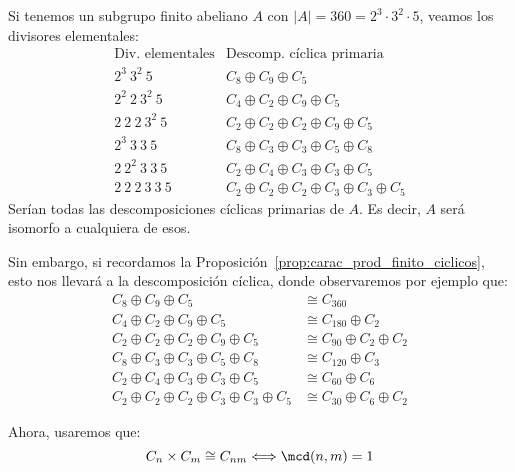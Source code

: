 \begin{ejemplo}
    Si tenemos un subgrupo finito abeliano $A$ con $|A| = 360 = 2^3\cdot 3^2\cdot 5$, veamos los divisores elementales:
    \begin{equation*}
        \begin{array}{r|l}
            \text{Div. elementales} & \text{Descomp. cíclica primaria} \\
            \hline
            2^3\ 3^2\ 5 & C_8\oplus C_9 \oplus C_5 \\
            2^2\ 2\ 3^2\ 5 & C_4\oplus C_2 \oplus C_9 \oplus C_5\\
            2\ 2\ 2\ 3^2\ 5 & C_2 \oplus C_2 \oplus C_2 \oplus C_9 \oplus C_5\\
            2^3\ 3\ 3\ 5 & C_8\oplus C_3 \oplus C_3 \oplus C_5 \oplus C_8\\
            2\ 2^2\ 3\ 3\ 5 & C_2 \oplus C_4 \oplus C_3 \oplus C_3 \oplus C_5\\
            2\ 2\ 2\ 3\ 3\ 5 & C_2 \oplus C_2 \oplus C_2 \oplus C_3 \oplus C_3 \oplus C_5
        \end{array}
    \end{equation*}
    Serían todas las descomposiciones cíclicas primarias de $A$. Es decir, $A$ será isomorfo a cualquiera de esos.
\end{ejemplo}

\noindent
Sin embargo, si recordamos la Proposición~\ref{prop:carac_prod_finito_ciclicos}, esto nos llevará a la descomposición cíclica, donde observaremos por ejemplo que:
\begin{align*}
    C_8\oplus C_9 \oplus C_5 &\cong C_{360} \\
    C_4\oplus C_2 \oplus C_9 \oplus C_5 &\cong C_{180} \oplus C_2 \\
    C_2 \oplus C_2 \oplus C_2 \oplus C_9 \oplus C_5 &\cong C_{90} \oplus C_2 \oplus C_2 \\
    C_8\oplus C_3 \oplus C_3 \oplus C_5 \oplus C_8 &\cong C_{120} \oplus C_3 \\
    C_2 \oplus C_4 \oplus C_3 \oplus C_3 \oplus C_5 &\cong C_{60} \oplus C_6 \\
    C_2 \oplus C_2 \oplus C_2 \oplus C_3 \oplus C_3 \oplus C_5 &\cong C_{30} \oplus C_6 \oplus C_2
\end{align*}

Ahora, usaremos que:
\begin{equation*}
    C_n\times C_m\cong C_{nm} \Longleftrightarrow \mcd(n,m) = 1
\end{equation*}

